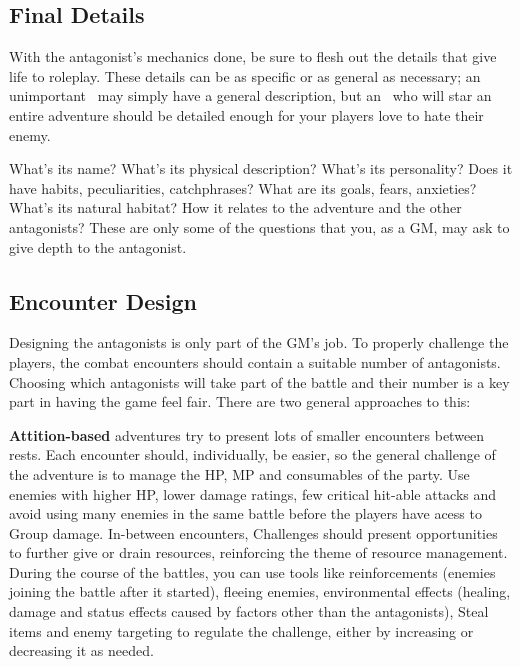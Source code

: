 \begin{multicols}{2}
\subsection{Final Details}\label{gm-findet}
With the antagonist’s mechanics done, be sure to flesh out the details that give life to roleplay. These details can be as specific or as general as necessary; an unimportant \tmobmini{}\ may simply have a general description, but an \tmobleet{}\ who will star an entire adventure should be detailed enough for your players love to hate their enemy.

What's its name? What’s its physical description? What’s its personality? Does it have habits, peculiarities, catchphrases? What are its goals, fears, anxieties? What’s its natural habitat? How it relates to the adventure and the other antagonists? These are only some of the questions that you, as a GM, may ask to give depth to the antagonist.

\subsection{Encounter Design}\label{gm-encdsg}
Designing the antagonists is only part of the GM's job. To properly challenge the players, the combat encounters should contain a suitable number of antagonists. Choosing which antagonists will take part of the battle and their number is a key part in having the game feel fair. There are two general approaches to this:

\textbf{Attition-based} adventures try to present lots of smaller encounters between rests. Each encounter should, individually, be easier, so the general challenge of the adventure is to manage the HP, MP and consumables of the party. Use enemies with higher HP, lower damage ratings, few critical hit-able attacks and avoid using many enemies in the same battle before the players have acess to Group damage. In-between encounters, Challenges should present opportunities to further give or drain resources, reinforcing the theme of resource management. During the course of the battles, you can use tools like reinforcements (enemies joining the battle after it started), fleeing enemies, environmental effects (healing, damage and status effects caused by factors other than the antagonists), Steal items and enemy targeting to regulate the challenge, either by increasing or decreasing it as needed.


\end{multicols}
